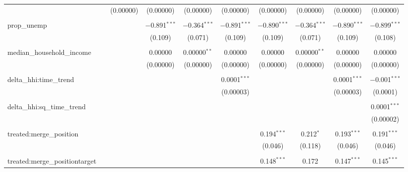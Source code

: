 \begin{table}[H]
{\begin{tabular}{@{\extracolsep{5pt}}lccccccccc}
   &  & (0.00000) & (0.00000) & (0.00000) & (0.00000) & (0.00000) & (0.00000) & (0.00000) & (0.00000) \\  

   & & & & & & & & & \\  

  prop\_unemp &  &  & $-$0.891$^{***}$ & $-$0.364$^{***}$ & $-$0.891$^{***}$ & $-$0.890$^{***}$ & $-$0.364$^{***}$ & $-$0.890$^{***}$ & $-$0.899$^{***}$ \\  

   &  &  & (0.109) & (0.071) & (0.109) & (0.109) & (0.071) & (0.109) & (0.108) \\  

   & & & & & & & & & \\  

  median\_household\_income &  &  & 0.00000 & 0.00000$^{**}$ & 0.00000 & 0.00000 & 0.00000$^{**}$ & 0.00000 & 0.00000 \\  

   &  &  & (0.00000) & (0.00000) & (0.00000) & (0.00000) & (0.00000) & (0.00000) & (0.00000) \\  

   & & & & & & & & & \\  

  delta\_hhi:time\_trend &  &  &  &  & 0.0001$^{***}$ &  &  & 0.0001$^{***}$ & $-$0.001$^{***}$ \\  

   &  &  &  &  & (0.00003) &  &  & (0.00003) & (0.0001) \\  

   & & & & & & & & & \\  

  delta\_hhi:sq\_time\_trend &  &  &  &  &  &  &  &  & 0.0001$^{***}$ \\  

   &  &  &  &  &  &  &  &  & (0.00002) \\  

   & & & & & & & & & \\  

  treated:merge\_position &  &  &  &  &  & 0.194$^{***}$ & 0.212$^{*}$ & 0.193$^{***}$ & 0.191$^{***}$ \\  

   &  &  &  &  &  & (0.046) & (0.118) & (0.046) & (0.046) \\  

   & & & & & & & & & \\  

  treated:merge\_positiontarget &  &  &  &  &  & 0.148$^{***}$ & 0.172 & 0.147$^{***}$ & 0.145$^{***}$ \\  


\end{tabular}}
\end{table}
